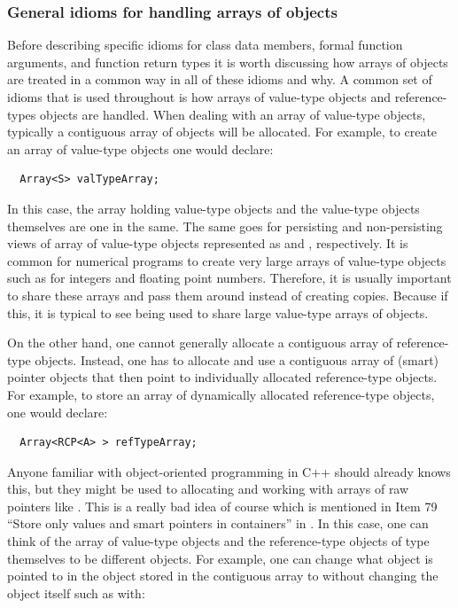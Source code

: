 \documentclass[pdf,ps2pdf,11pt]{SANDreport}
\begin{document}
%
{}\subsubsection{General idioms for handling arrays of objects}
%

Before describing specific idioms for class data members, formal
function arguments, and function return types it is worth discussing
how arrays of objects are treated in a common way in all of these
idioms and why.  A common set of idioms that is used throughout is how
arrays of value-type objects and reference-types objects are handled.
When dealing with an array of value-type objects, typically a
contiguous array of objects will be allocated.  For example, to create
an array of value-type objects one would declare:

{\small\begin{verbatim}
  Array<S> valTypeArray;
\end{verbatim}}

In this case, the array holding value-type objects and the value-type
objects themselves are one in the same.  The same goes for persisting
and non-persisting views of array of value-type objects represented as
{} and {},
respectively.  It is common for numerical programs to create very
large arrays of value-type objects such as for integers and floating
point numbers.  Therefore, it is usually important to share these
arrays and pass them around instead of creating copies.  Because if
this, it is typical to see {} being used
to share large value-type arrays of objects.

On the other hand, one cannot generally allocate a contiguous array of
reference-type objects.  Instead, one has to allocate and use a
contiguous array of (smart) pointer objects that then point to
individually allocated reference-type objects.  For example, to store
an array of dynamically allocated reference-type objects, one would
declare:

{\small\begin{verbatim}
  Array<RCP<A> > refTypeArray;
\end{verbatim}}

Anyone familiar with object-oriented programming in C++ should already
knows this, but they might be used to allocating and working with
arrays of raw pointers like {}.  This is a really
bad idea of course which is mentioned in Item 79 ``Store only values
and smart pointers in containers'' in {}\cite{C++CodingStandards05}.
In this case, one can think of the array of {} value-type
objects and the reference-type objects of type {} themselves to
be different objects.  For example, one can change what {}
object is pointed to in the {} object stored in the
contiguous array to without changing the {} object itself such
as with:
\end{document}
